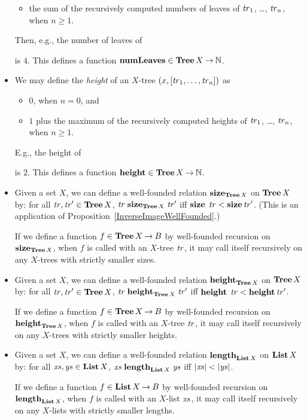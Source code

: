 \begin{itemize}
\begin{itemize}
  \item the sum of the recursively computed numbers of leaves of
    ${\it tr}_1$, \ldots, ${\it tr}_n$, when $n\geq 1$.
  \end{itemize}
  Then, e.g., the number of leaves of
  \begin{center}
    
  \end{center}
  is $4$. This defines a function ${\mathbf{numLeaves}}\in\mathbf{Tree}\,X\mathbin{\to}\mathbb{N}$.

\item We may define the \emph{height} of an $X$-tree
  $(x,[{\it tr}_1,\ldots,{\it tr}_n])$ as
  \begin{itemize}
  \item $0$, when $n=0$, and

  \item $1$ plus the maximum of the recursively computed heights
    of ${\it tr}_1$, \ldots, ${\it tr}_n$, when $n\geq 1$.
  \end{itemize}
  E.g., the height of
  \begin{center}
    
  \end{center}
  is $2$. This defines a function ${\mathrel{\mathbf{height}}}\in\mathbf{Tree}\,X\mathbin{\to}\mathbb{N}$.

\item Given a set $X$, we can define a well-founded relation
  $\mathrel{\mathbf{size}}_{\mathbf{Tree}\,X}$ on $\mathbf{Tree}\,X$ by: for all ${\it tr},{\it tr}'\in\mathbf{Tree}\,X$,
  ${\it tr}\mathrel{\mathrel{\mathbf{size}}_{\mathbf{Tree}\,X}}{\it tr}'$ iff
  $\mathrel{\mathbf{size}}\,{\it tr} < {\mathrel{\mathbf{size}}}\,{\it tr}'$.  (This is an application of
  Proposition~\ref{InverseImageWellFounded}.)

  If we define a function $f\in\mathbf{Tree}\,X\mathbin{\to} B$ by well-founded recursion
  on $\mathrel{\mathbf{size}}_{\mathbf{Tree}\,X}$, when $f$ is called with an $X$-tree ${\it tr}$,
  it may call itself recursively on any $X$-trees with strictly smaller sizes.
  
\item Given a set $X$, we can define a well-founded relation
  $\mathrel{\mathbf{height}}_{\mathbf{Tree}\,X}$ on $\mathbf{Tree}\,X$ by: for all
  ${\it tr},{\it tr}'\in\mathbf{Tree}\,X$, ${\it tr}\mathrel{\mathrel{\mathbf{height}}_{\mathbf{Tree}\,X}}{\it tr}'$ iff
  $\mathrel{\mathbf{height}}\,{\it tr} < {\mathrel{\mathbf{height}}}\,{\it tr}'$.

  If we define a function $f\in\mathbf{Tree}\,X\mathbin{\to} B$ by well-founded
  recursion on $\mathrel{\mathbf{height}}_{\mathbf{Tree}\,X}$, when $f$ is called with an
  $X$-tree ${\it tr}$, it may call itself recursively on any $X$-trees with
  strictly smaller heights.

\item Given a set $X$, we can define a well-founded relation
  $\mathrel{\mathbf{length}}_{\mathbf{List}\,X}$ on $\mathbf{List}\,X$ by: for all ${\it xs},{\it ys}\in\mathbf{List}\,X$,
  ${\it xs}\mathrel{\mathrel{\mathbf{length}}_{\mathbf{List}\,X}}{\it ys}$ iff $|\xs|<|\ys|$.

  If we define a function $f\in\mathbf{List}\,X\mathbin{\to} B$ by well-founded
  recursion on $\mathrel{\mathbf{length}}_{\mathbf{List}\,X}$, when $f$ is called with an
  $X$-list ${\it xs}$, it may call itself recursively on any $X$-lists with
  strictly smaller lengths.
\end{itemize}
%

